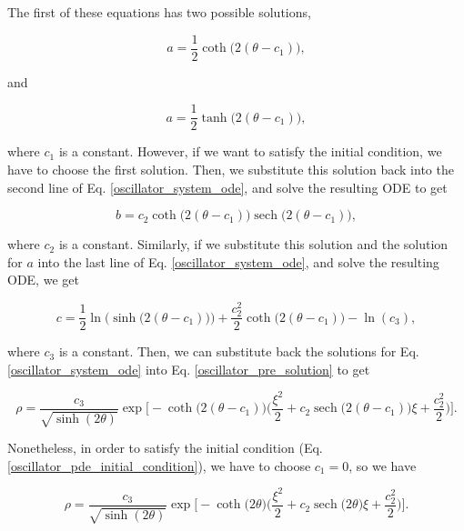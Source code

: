 \documentclass{article}
\DeclareMathOperator{\sech}{sech}
\begin{document}
The first of these equations has two possible solutions,

\begin{equation}
    a = \frac{1}{2} \coth\big(2(\theta - c_{1})\big),
\end{equation}

and 

\begin{equation}
    a = \frac{1}{2} \tanh\big(2(\theta - c_{1})\big),
\end{equation}

where $c_{1}$ is a constant.
However, if we want to satisfy the initial condition, we have to choose the first solution. Then, we substitute this solution back into the second line of Eq. \ref{oscillator_system_ode}, and solve the resulting ODE to get

\begin{equation}
    b = c_{2} \coth \big( 2(\theta - c_{1}) \big) \sech \big( 2(\theta - c_{1}) \big),
\end{equation}

where $c_{2}$ is a constant. Similarly, if we substitute this solution and the solution for $a$ into the last line of Eq. \ref{oscillator_system_ode}, and solve the resulting ODE, we get

\begin{equation}
    c = \frac{1}{2} \ln \Big(\sinh \big( 2(\theta - c_{1}) \big) \Big) + \frac{c_{2}^{2}}{2} \coth \big( 2(\theta - c_{1}) \big) - \ln (c_{3}),
\end{equation}

where $c_{3}$ is a constant. Then, we can substitute back the solutions for Eq. \ref{oscillator_system_ode} into Eq. \ref{oscillator_pre_solution} to get

\begin{equation}
    \rho = \frac{c_{3}}{\sqrt{\sinh(2\theta)}} \exp \bigg[ -\coth \big(2(\theta - c_{1})) \bigg( \frac{\xi^{2}}{2} + c_{2} \sech \big( 2(\theta - c_{1}) \big)\xi + \frac{c_{2}^{2}}{2} \bigg) \bigg]. 
\end{equation}

Nonetheless, in order to satisfy the initial condition (Eq. \ref{oscillator_pde_initial_condition}), we have to choose $c_{1}=0$, so we have

\begin{equation}
    \rho = \frac{c_{3}}{\sqrt{\sinh(2\theta)}} \exp \bigg[ -\coth \big(2\theta) \bigg( \frac{\xi^{2}}{2} + c_{2} \sech \big( 2\theta \big)\xi + \frac{c_{2}^{2}}{2} \bigg) \bigg]. 
\end{equation}
\end{document}

